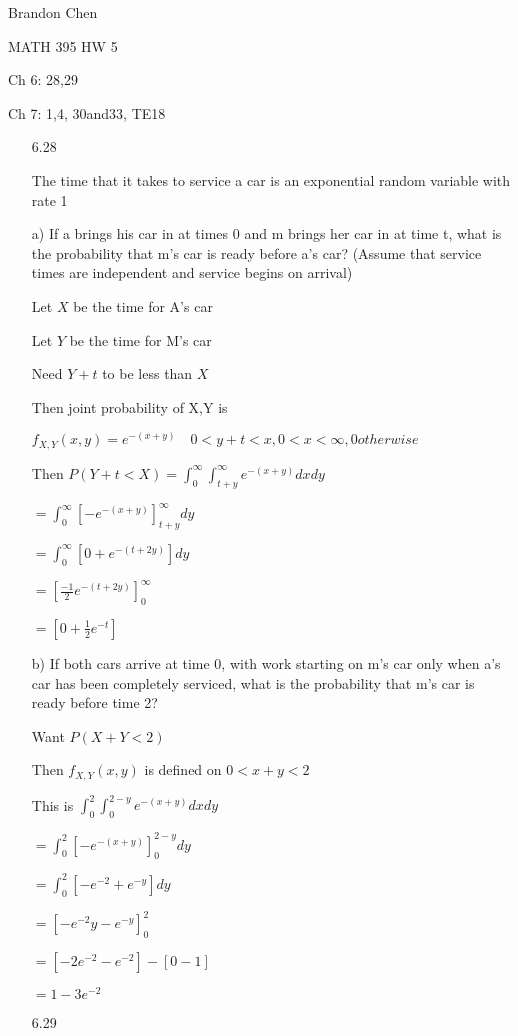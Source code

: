 \documentclass[11pt]{article}
\begin{document}
\noindent Brandon Chen

\noindent MATH 395 HW 5

\noindent Ch 6:  28,29

\noindent Ch 7: 1,4, 30and33, TE18

\begin{itemize}

\item[6.28]

	The time that it takes to service a car is an exponential random variable with rate 1

		a) If a brings his car in at times 0 and m brings her car in at time t, what is the probability that m's car is ready before a's car? (Assume that service times are independent and service begins on arrival)

		Let $X$ be the time for A's car

		Let $Y$ be the time for M's car

		Need $Y + t$ to be less than $X$

		Then joint probability of X,Y is

		$f_{X,Y}(x,y) = e^{-(x+y)} \quad 0 < y + t < x, 0 < x < \infty, 0 otherwise$

		Then $P(Y + t < X) = \int_0^{\infty} \int_{t+y}^{\infty} e^{-(x+y)}dxdy$

		$=\int_0^{\infty} [-e^{-(x+y)}]_{t+y}^{\infty} dy$

		$= \int_0^{\infty} [0+e^{-(t+2y)}]dy$

		$= [\frac{-1}{2} e^{-(t+2y)}]_0^{\infty}$

		$=[0 + \frac{1}{2}e^{-t}]$

		b) If both cars arrive at time 0, with work starting on m's car only when a's car has been completely serviced, what is the probability that m's car is ready before time 2?

	Want $P(X + Y < 2)$

		Then $f_{X,Y}(x,y)$ is defined on $0 < x + y < 2$

		This is $\int_0^2 \int_0^{2-y} e^{-(x+y)}dxdy$

		$= \int_0^2 [-e^{-(x+y)}]_0^{2-y}dy$

		$=\int_0^2 [-e^{-2} + e^{-y}] dy$

		$=[-e^{-2}y - e^{-y}]_0^2$

		$=[-2e^{-2} - e^{-2}] - [0 - 1]$

		$=1 - 3e^{-2}$

\item[6.29]


\end{itemize}
\end{document}
